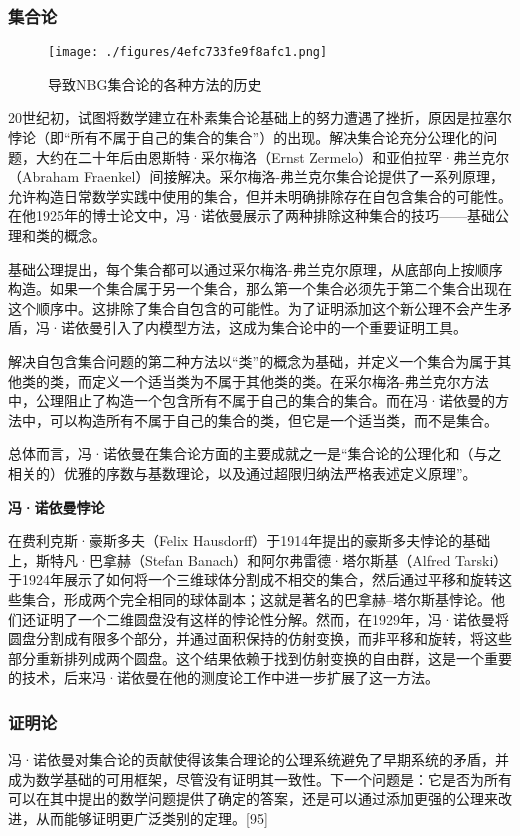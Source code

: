 \subsubsection{集合论}
\begin{figure}[ht]
\centering
\texttt{[image: ./figures/4efc733fe9f8afc1.png]}
\caption{导致NBG集合论的各种方法的历史} \label{fig_Neuman_4}
\end{figure}
20世纪初，试图将数学建立在朴素集合论基础上的努力遭遇了挫折，原因是拉塞尔悖论（即“所有不属于自己的集合的集合”）的出现。解决集合论充分公理化的问题，大约在二十年后由恩斯特·采尔梅洛（Ernst Zermelo）和亚伯拉罕·弗兰克尔（Abraham Fraenkel）间接解决。采尔梅洛-弗兰克尔集合论提供了一系列原理，允许构造日常数学实践中使用的集合，但并未明确排除存在自包含集合的可能性。在他1925年的博士论文中，冯·诺依曼展示了两种排除这种集合的技巧——基础公理和类的概念。

基础公理提出，每个集合都可以通过采尔梅洛-弗兰克尔原理，从底部向上按顺序构造。如果一个集合属于另一个集合，那么第一个集合必须先于第二个集合出现在这个顺序中。这排除了集合自包含的可能性。为了证明添加这个新公理不会产生矛盾，冯·诺依曼引入了内模型方法，这成为集合论中的一个重要证明工具。

解决自包含集合问题的第二种方法以“类”的概念为基础，并定义一个集合为属于其他类的类，而定义一个适当类为不属于其他类的类。在采尔梅洛-弗兰克尔方法中，公理阻止了构造一个包含所有不属于自己的集合的集合。而在冯·诺依曼的方法中，可以构造所有不属于自己的集合的类，但它是一个适当类，而不是集合。

总体而言，冯·诺依曼在集合论方面的主要成就之一是“集合论的公理化和（与之相关的）优雅的序数与基数理论，以及通过超限归纳法严格表述定义原理”。

\textbf{冯·诺依曼悖论}  

在费利克斯·豪斯多夫（Felix Hausdorff）于1914年提出的豪斯多夫悖论的基础上，斯特凡·巴拿赫（Stefan Banach）和阿尔弗雷德·塔尔斯基（Alfred Tarski）于1924年展示了如何将一个三维球体分割成不相交的集合，然后通过平移和旋转这些集合，形成两个完全相同的球体副本；这就是著名的巴拿赫–塔尔斯基悖论。他们还证明了一个二维圆盘没有这样的悖论性分解。然而，在1929年，冯·诺依曼将圆盘分割成有限多个部分，并通过面积保持的仿射变换，而非平移和旋转，将这些部分重新排列成两个圆盘。这个结果依赖于找到仿射变换的自由群，这是一个重要的技术，后来冯·诺依曼在他的测度论工作中进一步扩展了这一方法。
\subsubsection{证明论} 
冯·诺依曼对集合论的贡献使得该集合理论的公理系统避免了早期系统的矛盾，并成为数学基础的可用框架，尽管没有证明其一致性。下一个问题是：它是否为所有可以在其中提出的数学问题提供了确定的答案，还是可以通过添加更强的公理来改进，从而能够证明更广泛类别的定理。[95]

